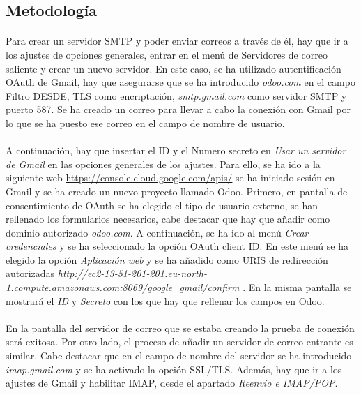 \subsection{Metodología}
\paragraph{}
Para crear un servidor SMTP y poder enviar correos a través de él, hay que ir a los ajustes de opciones generales, entrar en el menú de Servidores de correo saliente y crear un nuevo servidor. En este caso, se ha utilizado autentificación OAuth de Gmail, hay que asegurarse que se ha introducido \textit{odoo.com} en el campo Filtro DESDE, TLS como encriptación, \textit{smtp.gmail.com} como servidor SMTP y puerto 587. Se ha creado un correo para llevar a cabo la conexión con Gmail por lo que se ha puesto ese correo en el campo de nombre de usuario. 
\paragraph{}
A continuación, hay que insertar el ID y el Numero secreto en \textit{Usar un servidor de Gmail} en las opciones generales de los ajustes. Para ello, se ha ido a la siguiente web \href{https://console.cloud.google.com/apis/}{https://console.cloud.google.com/apis/} se ha iniciado sesión en Gmail y se ha creado un nuevo proyecto llamado Odoo. Primero, en pantalla de consentimiento de OAuth se ha elegido el tipo de usuario externo, se han rellenado los formularios necesarios, cabe destacar que hay que añadir como dominio autorizado \textit{odoo.com}. A continuación, se ha ido al menú \textit{Crear credenciales} y se ha seleccionado la opción OAuth client ID. En este menú se ha elegido la opción \textit{Aplicación web} y se ha añadido como URIS de redirección autorizadas \textit{http://ec2-13-51-201-201.eu-north-1.compute.amazonaws.com:8069/google\_gmail/confirm} . En la misma pantalla se mostrará el \textit{ID} y \textit{Secreto} con los que hay que rellenar los campos en Odoo. 
\paragraph{}
En la pantalla del servidor de correo que se estaba creando la prueba de conexión será exitosa. Por otro lado, el proceso de añadir un servidor de correo entrante es similar. Cabe destacar que en el campo de nombre del servidor se ha introducido \textit{imap.gmail.com} y se ha activado la opción SSL/TLS. Además, hay que ir a los ajustes de Gmail y habilitar IMAP, desde el apartado \textit{Reenvío e IMAP/POP}. 
